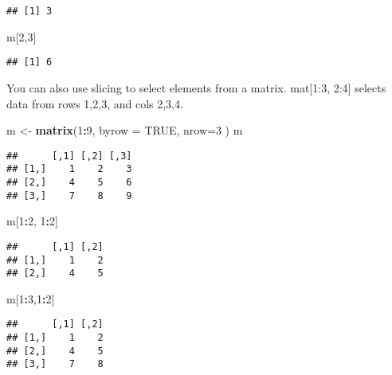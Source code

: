 \documentclass[
]{article}
\newenvironment{Shaded}{\begin{snugshade}}{\end{snugshade}}
\newcommand{\DataTypeTok}[1]{\textcolor[rgb]{0.13,0.29,0.53}{#1}}
\newcommand{\DecValTok}[1]{\textcolor[rgb]{0.00,0.00,0.81}{#1}}
\newcommand{\KeywordTok}[1]{\textcolor[rgb]{0.13,0.29,0.53}{\textbf{#1}}}
\newcommand{\NormalTok}[1]{#1}
\newcommand{\OperatorTok}[1]{\textcolor[rgb]{0.81,0.36,0.00}{\textbf{#1}}}
\newcommand{\OtherTok}[1]{\textcolor[rgb]{0.56,0.35,0.01}{#1}}
\newcommand{\StringTok}[1]{\textcolor[rgb]{0.31,0.60,0.02}{#1}}
\begin{document}
\begin{verbatim}
## [1] 3
\end{verbatim}

\begin{Shaded}
\begin{Highlighting}[]
\NormalTok{m[}\DecValTok{2}\NormalTok{,}\DecValTok{3}\NormalTok{]}
\end{Highlighting}
\end{Shaded}

\begin{verbatim}
## [1] 6
\end{verbatim}

You can also use slicing to select elements from a matrix. mat{[}1:3,
2:4{]} selects data from rows 1,2,3, and cols 2,3,4.

\begin{Shaded}
\begin{Highlighting}[]
\NormalTok{m <-}\StringTok{ }\KeywordTok{matrix}\NormalTok{(}\DecValTok{1}\OperatorTok{:}\DecValTok{9}\NormalTok{, }\DataTypeTok{byrow =} \OtherTok{TRUE}\NormalTok{, }\DataTypeTok{nrow=}\DecValTok{3}\NormalTok{ )}
\NormalTok{m}
\end{Highlighting}
\end{Shaded}

\begin{verbatim}
##      [,1] [,2] [,3]
## [1,]    1    2    3
## [2,]    4    5    6
## [3,]    7    8    9
\end{verbatim}

\begin{Shaded}
\begin{Highlighting}[]
\NormalTok{m[}\DecValTok{1}\OperatorTok{:}\DecValTok{2}\NormalTok{, }\DecValTok{1}\OperatorTok{:}\DecValTok{2}\NormalTok{]}
\end{Highlighting}
\end{Shaded}

\begin{verbatim}
##      [,1] [,2]
## [1,]    1    2
## [2,]    4    5
\end{verbatim}

\begin{Shaded}
\begin{Highlighting}[]
\NormalTok{m[}\DecValTok{1}\OperatorTok{:}\DecValTok{3}\NormalTok{,}\DecValTok{1}\OperatorTok{:}\DecValTok{2}\NormalTok{]}
\end{Highlighting}
\end{Shaded}

\begin{verbatim}
##      [,1] [,2]
## [1,]    1    2
## [2,]    4    5
## [3,]    7    8
\end{verbatim}
\end{document}
